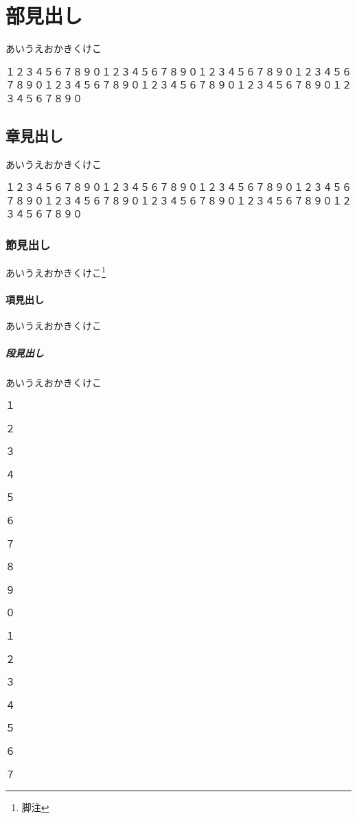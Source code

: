 \part{部見出し}

あいうえおかきくけこ

１２３４５６７８９０１２３４５６７８９０１２３４５６７８９０１２３４５６７８９０１２３４５６７８９０１２３４５６７８９０１２３４５６７８９０１２３４５６７８９０

\chapter{章見出し}

あいうえおかきくけこ

１２３４５６７８９０１２３４５６７８９０１２３４５６７８９０１２３４５６７８９０１２３４５６７８９０１２３４５６７８９０１２３４５６７８９０１２３４５６７８９０

\section{節見出し}

あいうえおかきくけこ\footnote{脚注}

\subsection{項見出し}

あいうえおかきくけこ

\subsubsection{段見出し}

あいうえおかきくけこ

\clearpage

１

２

３

４

５

６

７

８

９

０

１

２

３

４

５

６

７

